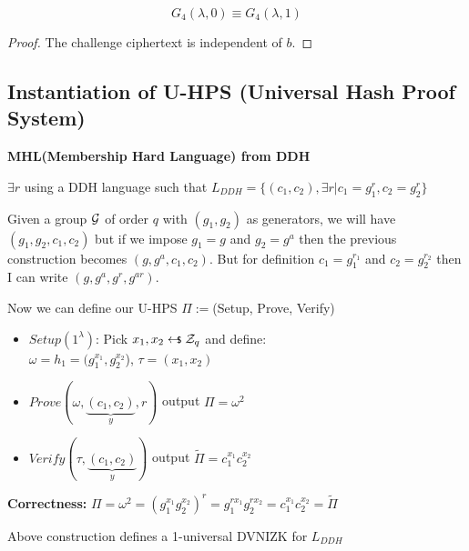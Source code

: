 \begin{lemma}
    \[
        G_{4}(\lambda, 0)\equiv G_{4}(\lambda, 1)   
    \]
\end{lemma}
\begin{proof}
    The challenge ciphertext is independent of $b$.
\end{proof}






\subsection{Instantiation of U-HPS (Universal Hash Proof System)}
\textbf{MHL(Membership Hard Language) from DDH}

$\exists r$ using a DDH language such that $L_{DDH}=\{(c_1,c_2), \exists r | c_1=g_1^r, c_2=g_2^r\}$

Given a group $\mathcal{G}$ of order $q$ with $(g_1,g_2)$ as generators, we will have $(g_1,g_2,c_1,c_2)$ but if we impose $g_1=g$ and $g_2=g^a$ then the previous construction becomes $(g,g^a,c_1,c_2)$. But for definition $c_1=g_1^{r_1}$ and $c_2=g_2^{r_2}$ then I can write $(g,g^a,g^r,g^{ar})$.

Now we can define our U-HPS $\Pi:=$(Setup, Prove, Verify)

\begin{itemize}
    \item $Setup(1^\lambda)$: Pick $x_1,x_2 \pickUAR \Z_q$ and define:\\ $\omega=h_1=(g_1^{x_1},g_2^{x_2}$), $\tau=(x_1,x_2)$
    \item $Prove(\omega, \underbrace{(c_1,c_2)}_{y}, r)$ output $\Pi=\omega^2$
    \item $Verify(\tau, \underbrace{(c_1,c_2)}_{y})$ output $\widetilde{\Pi}=c_1^{x_1}c_2^{x_2}$ %
\end{itemize}

\textbf{Correctness:} $\Pi=\omega^2=(g_1^{x_1}g_2^{x_2})^r=g_1^{rx_1}g_2^{rx_2}=c_1^{x_1}c_2^{x_2}=\widetilde{\Pi}$

\begin{theorem}
    Above construction defines a 1-universal DVNIZK for $L_{DDH}$
\end{theorem}

